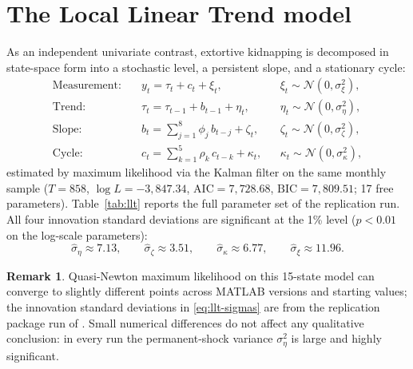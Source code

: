 \documentclass[12pt]{article}
\numberwithin{equation}{section}
\numberwithin{table}{section}
\theoremstyle{definition}
\newtheorem{remark}[theorem]{Remark}
\begin{document}
\section{The Local Linear Trend model}
\label{sec:llt}

As an independent univariate contrast, extortive kidnapping is decomposed in
state-space form \citep{Harvey1989} into a stochastic level, a persistent
slope, and a stationary cycle:
\begin{equation}
\begin{aligned}
\text{Measurement:} \quad & y_t = \tau_t + c_t + \xi_t,
&& \xi_t \sim \mathcal{N}(0,\sigma_\xi^2), \\[4pt]
\text{Trend:} \quad & \tau_t = \tau_{t-1} + b_{t-1} + \eta_t,
&& \eta_t \sim \mathcal{N}(0,\sigma_\eta^2), \\[4pt]
\text{Slope:} \quad & b_t = \textstyle\sum_{j=1}^{8}\phi_j\, b_{t-j} + \zeta_t,
&& \zeta_t \sim \mathcal{N}(0,\sigma_\zeta^2), \\[4pt]
\text{Cycle:} \quad & c_t = \textstyle\sum_{k=1}^{5}\rho_k\, c_{t-k} + \kappa_t,
&& \kappa_t \sim \mathcal{N}(0,\sigma_\kappa^2),
\end{aligned}
\label{eq:llt}
\end{equation}
estimated by maximum likelihood via the Kalman filter on the same monthly
sample ($T=858$, $\log L = -3{,}847.34$, $\mathrm{AIC}=7{,}728.68$,
$\mathrm{BIC}=7{,}809.51$; 17 free parameters). Table~\ref{tab:llt} reports
the full parameter set of the replication run. All four innovation standard
deviations are significant at the 1\% level ($p<0.01$ on the log-scale
parameters):
\begin{equation}
\hat\sigma_\eta \approx 7.13, \qquad
\hat\sigma_\zeta \approx 3.51, \qquad
\hat\sigma_\kappa \approx 6.77, \qquad
\hat\sigma_\xi \approx 11.96 .
\label{eq:llt-sigmas}
\end{equation}

\begin{remark}
Quasi-Newton maximum likelihood on this 15-state model can converge to
slightly different points across MATLAB versions and starting values; the
innovation standard deviations in \eqref{eq:llt-sigmas} are from the
replication package run of . Small numerical
differences do not affect any qualitative conclusion: in every run the
permanent-shock variance $\sigma_\eta^2$ is large and highly significant.
\end{remark}
\end{document}

